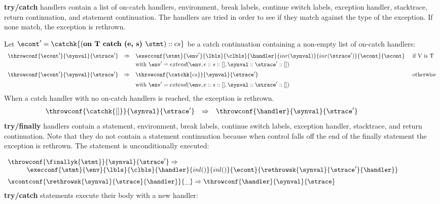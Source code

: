 \documentclass{article}
\begin{document}
\noindent
\textbf{try/catch} handlers contain a list of on-catch handlers, environment, break labels, continue switch labels, exception handler, stacktrace, return continuation, and statement continuation. The handlers are tried in order to see if they match against the type of the exception. If none match, the exception is rethrown.

\noindent
Let $\econt' = \catchk{(\textbf{on T catch (e, s) }\stmt) :: cs}$ be a catch continuation containing a non-empty list of on-catch handlers:
\[
  \begin{array}{lcll}
	\throwconf{\econt'}{\synval}{\strace'}
	& \Rightarrow &
	\execconf{\stmt}{\env'}{\lbls}{\clbls}{\handler}{inr(\synval)}{inr(\strace')}{\econt}{\scont}
	&\textrm{ if V is T}\\[1mm]

	&&\textrm{with } \env' = extend(\env, e :: s :: [], \synval :: \strace' :: [])\\[2mm]

	\throwconf{\econt'}{\synval}{\strace'}
	& \Rightarrow &
	\throwconf{\catchk{cs}}{\synval}{\strace'}	&\textrm{ otherwise}\\[2mm]
	&&\textrm{with } \env' = extend(\env, e :: s :: [], \synval :: \strace' :: [])
  \end{array}
\]
\noindent
When a catch handler with no on-catch handlers is reached, the exception is rethrown.
\[
  \begin{array}{lcll}
	\throwconf{\catchk{[]}}{\synval}{\strace'}
	& \Rightarrow &
	\throwconf{\handler}{\synval}{\strace'}\hspace{20mm}
  \end{array}
\]
\noindent
\textbf{try/finally} handlers contain a statement, environment, break labels, continue switch labels, exception handler, stacktrace, and return continuation. Note that they do not contain a statement continuation because when control falls off the end of the finally statement the exception is rethrown. The statement is unconditionally executed:

\[
  \begin{array}{lcl}
	\throwconf{\finallyk{\stmt}}{\synval}{\strace'}
	\Rightarrow \\
	\hspace{10mm}\execconf{\stmt}{\env}{\lbls}{\clbls}{\handler}{inl()}{inl()}{\econt}{\rethrowsk{\synval}{\strace'}{\handler}}\hspace{20mm}\\[2mm]

	\scontconf{\rethrowsk{\synval}{\strace}{\handler}}{\_}
	\Rightarrow \throwconf{\handler}{\synval}{\strace}

  \end{array}
\]
\noindent
\textbf{try/catch} statements execute their body with a new handler:
\end{document}
